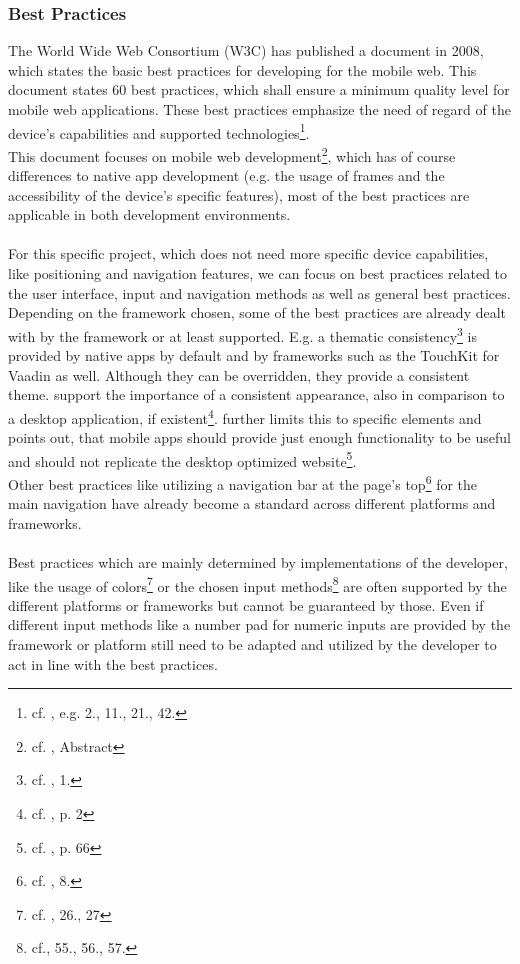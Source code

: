 \subsubsection{Best Practices}
The World Wide Web Consortium (W3C) has published a document in 2008, which states the basic best practices for developing for the mobile web. This document states 60 best practices, which shall ensure a minimum quality level for mobile web applications. These best practices emphasize the need of regard of the device's capabilities and supported technologies\footnote{cf. \cite{WorldWideWebConsortium.2008}, e.g. 2., 11., 21., 42.}. 
\\
This document focuses on mobile web development\footnote{cf. \cite{WorldWideWebConsortium.2008}, Abstract}, which has of course differences to native app development (e.g. the usage of frames and the accessibility of the device's specific features), most of the best practices are applicable in both development environments.
\\
\\
For this specific project, which does not need more specific device capabilities, like positioning and navigation features, we can focus on best practices related to the user interface, input and navigation methods as well as general best practices. Depending on the framework chosen, some of the best practices are already dealt with by the framework or at least supported. E.g. a thematic consistency\footnote{cf. \cite{WorldWideWebConsortium.2008}, 1.} is provided by native apps by default and by frameworks such as the TouchKit for Vaadin as well. Although they can be overridden, they provide a consistent theme. \cite{Wessels.2011} support the importance of a consistent appearance, also in comparison to a desktop application, if existent\footnote{cf. \cite{Wessels.2011}, p. 2}. \cite{Lica.2010} further limits this to specific elements and points out, that mobile apps should provide just enough functionality to be useful and should not replicate the desktop optimized website\footnote{cf. \cite{Lica.2010}, p. 66}.
\\
Other best practices like utilizing a navigation bar at the page's top\footnote{cf. \cite{WorldWideWebConsortium.2008}, 8.} for the main navigation have already become a standard across different platforms and frameworks.
\\
\\
Best practices which are mainly determined by implementations of the developer, like the usage of colors\footnote{cf. \cite{WorldWideWebConsortium.2008}, 26., 27} or the chosen input methods\footnote{cf.\cite{WorldWideWebConsortium.2008}, 55., 56., 57.} are often supported by the different platforms or frameworks but cannot be guaranteed by those. Even if different input methods like a number pad for numeric inputs are provided by the framework or platform still need to be adapted and utilized by the developer to act in line with the best practices.
